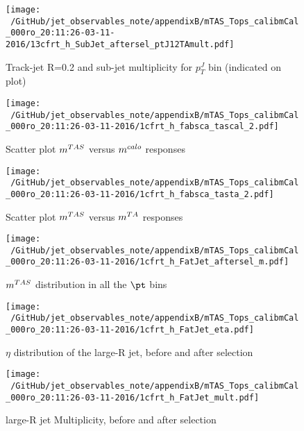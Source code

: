 \begin{figure}

\texttt{[image: ~/GitHub/jet\_observables\_note/appendixB/mTAS\_Tops\_calibmCal\_000ro\_20:11:26-03-11-2016/13cfrt\_h\_SubJet\_aftersel\_ptJ12TAmult.pdf]}
\caption{Track-jet R=0.2 and sub-jet multiplicity for $p_{T}^{J}$ bin (indicated on plot) }

\end{figure}

\clearpage %

\begin{figure}

\texttt{[image: ~/GitHub/jet\_observables\_note/appendixB/mTAS\_Tops\_calibmCal\_000ro\_20:11:26-03-11-2016/1cfrt\_h\_fabsca\_tascal\_2.pdf]}
\caption{Scatter plot $m^{TAS}$ versus $m^{calo}$ responses}

\end{figure}
 
\begin{figure}
 
\texttt{[image: ~/GitHub/jet\_observables\_note/appendixB/mTAS\_Tops\_calibmCal\_000ro\_20:11:26-03-11-2016/1cfrt\_h\_fabsca\_tasta\_2.pdf]}
\caption{Scatter plot $m^{TAS}$ versus $m^{TA}$ responses}
 
\end{figure}
 
\begin{figure}
 
\texttt{[image: ~/GitHub/jet\_observables\_note/appendixB/mTAS\_Tops\_calibmCal\_000ro\_20:11:26-03-11-2016/1cfrt\_h\_FatJet\_aftersel\_m.pdf]}
\caption{$m^{TAS}$ distribution in all the $\pt$ bins}
 
\end{figure}
 
\begin{figure}
 
\texttt{[image: ~/GitHub/jet\_observables\_note/appendixB/mTAS\_Tops\_calibmCal\_000ro\_20:11:26-03-11-2016/1cfrt\_h\_FatJet\_eta.pdf]}
\caption{$\eta$ distribution of the large-R jet, before and after selection}
 
\end{figure}

\begin{figure}
 
\texttt{[image: ~/GitHub/jet\_observables\_note/appendixB/mTAS\_Tops\_calibmCal\_000ro\_20:11:26-03-11-2016/1cfrt\_h\_FatJet\_mult.pdf]}
\caption{large-R jet Multiplicity, before and after selection}
 
\end{figure}
 
